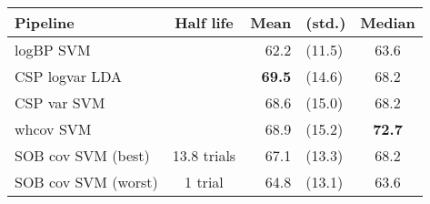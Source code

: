 \begin{tabular}{l c r@{ }l c}
\toprule
Pipeline & Half life & Mean & (std.) & Median\\
\midrule
logBP SVM && 62.2 &(11.5) & 63.6\\
CSP logvar LDA  && \textbf{69.5} &(14.6) & 68.2\\
CSP var SVM && 68.6 &(15.0) & 68.2\\
whcov SVM && 68.9 &(15.2) & \textbf{72.7}\\
SOB cov SVM (best) & 13.8 trials & 67.1 &(13.3) & 68.2\\
SOB cov SVM (worst)& 1 trial & 64.8 &(13.1) & 63.6\\
\bottomrule
\end{tabular}
